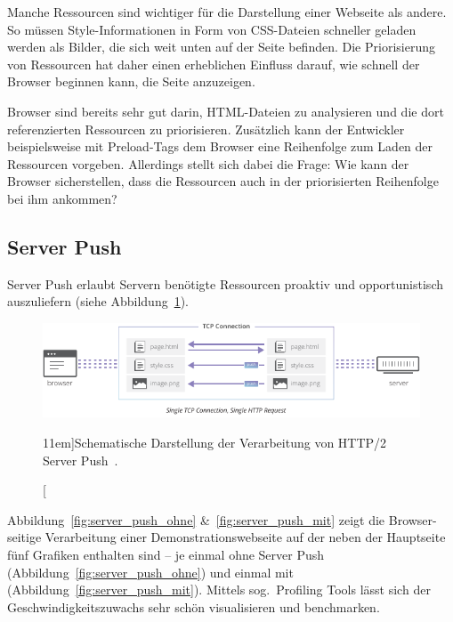 \documentclass[a4paper, justified, notoc]{tufte-handout} %
\begin{document}
Manche Ressourcen sind wichtiger für die Darstellung einer Webseite als andere. So müssen Style-Informationen in Form von CSS-Dateien schneller geladen werden als Bilder, die sich weit unten auf der Seite befinden. Die Priorisierung von Ressourcen hat daher einen erheblichen Einfluss darauf, wie schnell der Browser beginnen kann, die Seite anzuzeigen.

Browser sind bereits sehr gut darin, HTML-Dateien zu analysieren und die dort referenzierten Ressourcen zu priorisieren. Zusätzlich kann der Entwickler beispielsweise mit Preload-Tags dem Browser eine Reihenfolge zum Laden der Ressourcen vorgeben. Allerdings stellt sich dabei die Frage: Wie kann der Browser sicherstellen, dass die Ressourcen auch in der priorisierten Reihenfolge bei ihm ankommen?



\subsection{Server Push} %
\label{sub:server_push}

Server Push erlaubt Servern benötigte Ressourcen proaktiv und opportunistisch auszuliefern (siehe Abbildung~\ref{fig:schema_http2_server_push}).  

\begin{figure}%
	\centering
  \includegraphics[width=1.55\textwidth]{./figures/http2_server_push.pdf}
  \caption[][11em]{Schematische Darstellung der Verarbeitung von HTTP/2 Server Push~\citep{vlad:2016}.}
  \label{fig:schema_http2_server_push}
\end{figure}


Abbildung~\ref{fig:server_push_ohne} \&~\ref{fig:server_push_mit} zeigt die Browser-seitige Verarbeitung einer Demonstrationswebseite auf der neben der Hauptseite fünf Grafiken enthalten sind -- je einmal ohne Server Push (Abbildung~\ref{fig:server_push_ohne}) und einmal mit (Abbildung~\ref{fig:server_push_mit}).
Mittels sog.\ Profiling Tools lässt sich der Geschwindigkeitszuwachs sehr schön visualisieren und benchmarken. 
\end{document}
